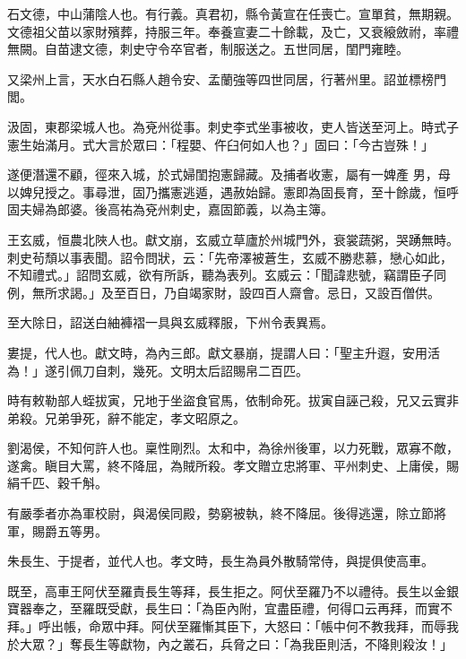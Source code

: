 \begin{pinyinscope}
 石文德，中山蒲陰人也。有行義。真君初，縣令黃宣在任喪亡。宣單貧，無期親。文德祖父苗以家財殯葬，持服三年。奉養宣妻二十餘載，及亡，又衰縗斂祔，率禮無闕。自苗逮文德，刺史守令卒官者，制服送之。五世同居，閨門雍睦。



 又梁州上言，天水白石縣人趙令安、孟蘭強等四世同居，行著州里。詔並標榜門閭。



 汲固，東郡梁城人也。為兗州從事。刺史李式坐事被收，吏人皆送至河上。時式子憲生始滿月。式大言於眾曰：「程嬰、仵臼何如人也？」固曰：「今古豈殊！」



 遂便潛還不顧，徑來入城，於式婦閨抱憲歸藏。及捕者收憲，屬有一婢產
 男，母以婢兒授之。事尋泄，固乃攜憲逃遁，遇赦始歸。憲即為固長育，至十餘歲，恒呼固夫婦為郎婆。後高祐為兗州刺史，嘉固節義，以為主簿。



 王玄威，恒農北陜人也。獻文崩，玄威立草廬於州城門外，衰裳蔬粥，哭踴無時。刺史茍頹以事表聞。詔令問狀，云：「先帝澤被蒼生，玄威不勝悲慕，戀心如此，不知禮式。」詔問玄威，欲有所訴，聽為表列。玄威云：「聞諱悲號，竊謂臣子同例，無所求謁。」及至百日，乃自竭家財，設四百人齋會。忌日，又設百僧供。



 至大除日，詔送白紬褲褶一具與玄威釋服，下州令表異焉。



 婁提，代人也。獻文時，為內三郎。獻文暴崩，提謂人曰：「聖主升遐，安用活為！」遂引佩刀自刺，幾死。文明太后詔賜帛二百匹。



 時有敕勒部人蛭拔寅，兄地于坐盜食官馬，依制命死。拔寅自誣己殺，兄又云實非弟殺。兄弟爭死，辭不能定，孝文昭原之。



 劉渴侯，不知何許人也。稟性剛烈。太和中，為徐州後軍，以力死戰，眾寡不敵，遂禽。瞋目大罵，終不降屈，為賊所殺。孝文贈立忠將軍、平州刺史、上庸侯，賜絹千匹、穀千斛。



 有嚴季者亦為軍校尉，與渴侯同殿，勢窮被執，終不降屈。後得逃還，除立節將軍，賜爵五等男。



 朱長生、于提者，並代人也。孝文時，長生為員外散騎常侍，與提俱使高車。



 既至，高車王阿伏至羅責長生等拜，長生拒之。阿伏至羅乃不以禮待。長生以金銀寶器奉之，至羅既受獻，長生曰：「為臣內附，宜盡臣禮，何得口云再拜，而實不拜。」呼出帳，命眾中拜。阿伏至羅慚其臣下，大怒曰：「帳中何不教我拜，而辱我於大眾？」奪長生等獻物，內之叢石，兵脅之曰：「為我臣則活，不降則殺汝！」




\end{pinyinscope}
